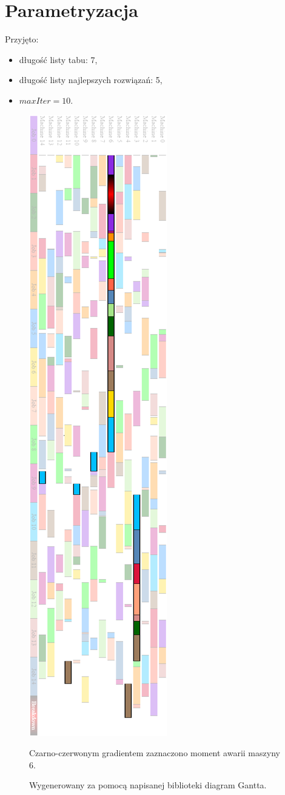 \documentclass[printmode,oneside]{mgr}
\begin{document}
\section{Parametryzacja}
Przyjęto:
\begin{itemize}
 	\item długość listy tabu: 7,
 	\item długość listy najlepszych rozwiązań: 5,
 	\item $maxIter = 10$.
\end{itemize}
%
\begin{figure}[t!]
\begin{center}
\includegraphics[scale=0.58]{rysunki/scheduleTail00.png}
\caption{Wygenerowany za pomocą napisanej biblioteki diagram Gantta.}{Czarno-czerwonym gradientem zaznaczono moment awarii maszyny 6.}
\label{rys_Gantt_HTML}
\end{center}
\end{figure}
%
\end{document}
